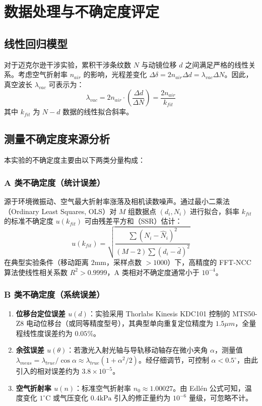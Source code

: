 \documentclass[twocolumn, a4paper, 10pt]{article}
\begin{document}
\section{数据处理与不确定度评定}
\subsection{线性回归模型}
对于迈克尔逊干涉实验，累积干涉条纹数 $N$ 与动镜位移 $d$ 之间满足严格的线性关系。考虑空气折射率 $n_{air}$ 的影响，光程差变化 $\Delta \delta = 2 n_{air} \Delta d = \lambda_{vac} \Delta N$。因此，真空波长 $\lambda_{vac}$ 可表示为：
\begin{equation}
    \lambda_{vac} = 2 n_{air} \cdot \left( \frac{\Delta d}{\Delta N} \right) = \frac{2 n_{air}}{k_{fit}}
\end{equation}
其中 $k_{fit}$ 为 $N-d$ 数据的线性拟合斜率。

\subsection{测量不确定度来源分析}
本实验的不确定度主要由以下两类分量构成：

\subsubsection{A 类不确定度（统计误差）}
源于环境微振动、空气最大折射率涨落及相机读数噪声。通过最小二乘法（Ordinary Least Squares, OLS）对 $M$ 组数据点 $(d_i, N_i)$ 进行拟合，斜率 $k_{fit}$ 的标准不确定度 $u(k_{fit})$ 可由残差平方和（SSR）估计：
\begin{equation}
    u(k_{fit}) = \sqrt{\frac{\sum (N_i - \hat{N}_i)^2}{(M-2) \sum (d_i - \bar{d})^2}}
\end{equation}
在典型实验条件（移动距离 $2\text{mm}$，采样点数 $>1000$）下，高精度的 FFT-NCC 算法使线性相关系数 $R^2 > 0.9999$，A 类相对不确定度通常小于 $10^{-4}$。

\subsubsection{B 类不确定度（系统误差）}
\begin{enumerate}
    \item \textbf{位移台定位误差 $u(d)$}：实验采用 Thorlabs Kinesis KDC101 控制的 MTS50-Z8 电动位移台（或同等精度型号），其典型单向重复定位精度为 $1.5 \mu m$，全量程线性度误差约为 $0.05\%$。
    \item \textbf{余弦误差 $u(\theta)$}：若激光入射光轴与导轨移动轴存在微小夹角 $\alpha$，测量值 $\lambda_{meas} = \lambda_{true} / \cos \alpha \approx \lambda_{true} (1 + \alpha^2/2)$。经仔细调节，可控制 $\alpha < 0.5^\circ$，由此引入的相对误差约为 $3.8 \times 10^{-5}$。
    \item \textbf{空气折射率 $u(n)$}：标准空气折射率 $n_0 \approx 1.00027$。由 Edlén 公式可知，温度变化 $1^\circ \text{C}$ 或气压变化 $0.4\text{kPa}$ 引入的修正量约为 $10^{-6}$ 量级，可忽略不计。
\end{enumerate}
\end{document}
